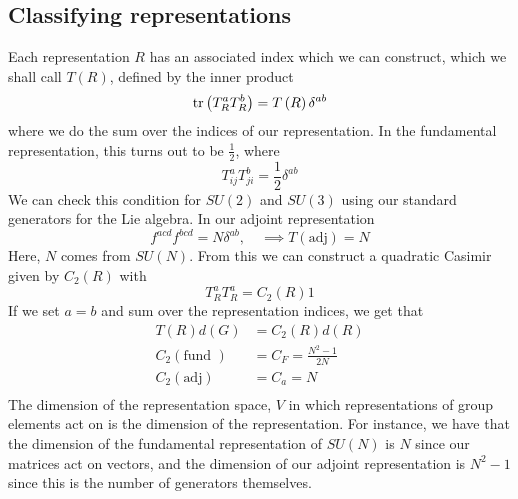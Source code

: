 \documentclass[11pt, oneside]{article}   	%
\theoremstyle{slanted}
\begin{document}
\subsection{Classifying representations}
Each representation $ R  $ has an associated 
index which we can construct, which we shall call $ T \left(  R  \right)  $, 
defined by the inner product 
\[
	\tr\left( T _ R ^ a T _ R ^ b  \right)    = T \left( R  \right)  \delta ^{ ab } 
\] where we do the sum over the indices of our 
representation. 
In the fundamental representation, this turns 
out to be $\frac{1}{2 }$, where 
\[
 T _{ ij } ^ a T _{ ji  } ^ b  = \frac{1}{2 } \delta ^{ ab } 
\] We can check this 
condition for $ SU \left( 2  \right)  $ and $ SU \left( 3  \right)  $ 
using our standard generators for the Lie algebra. 
In our adjoint representation 
\[
	f ^{ acd  } f ^{ bcd  }  = N \delta ^{ ab } , \quad \implies T \left( \text{adj} \right)  = N 
\] Here, $ N $ comes from $ SU \left( N   \right)  $. 
From 
this we can construct a quadratic 
Casimir given by $ C _ 2 \left( R  \right)   $ with 
\[
 T _ R ^ a T _ R ^ a   = C _ 2 \left( R  \right)  1 
\] If we set $ a  =b  $ and sum over 
the representation indices, we get that 
\begin{align*}
	T \left( R   \right)  d \left( G  \right)  &=  C _ 2 \left( R   \right) d \left(  R  \right)   \\ 
	C _ 2 \left( \text{fund }  \right)  &=  C _ F  = \frac{N ^  2- 1  }{ 2 N }   \\ 
	C _ 2 \left( \text{adj}   \right)  &=  C _  a = N  \\
\end{align*}
The dimension of the representation space, $ V $ in which 
representations of group elements act on
is the dimension of the representation. For instance, 
we have that the dimension of the fundamental representation of $ SU \left( N \right) $
is $ N $ since our matrices act on 
vectors, and the dimension of our adjoint representation 
is $ N ^ 2  - 1 $ since this is the number of generators themselves. 
\end{document}
